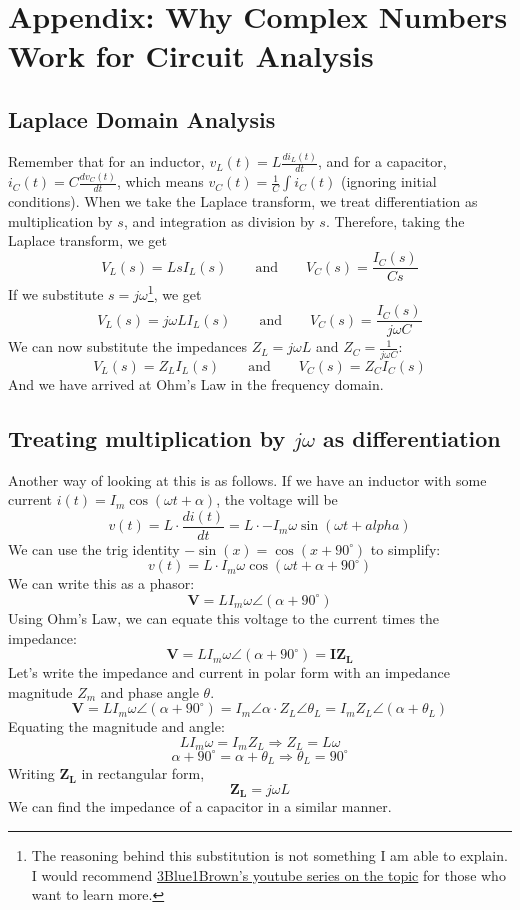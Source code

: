 \documentclass{article}
\begin{document}
\section{Appendix: Why Complex Numbers Work for Circuit Analysis}
\subsection*{Laplace Domain Analysis}
Remember that for an inductor, $v_L(t) = L\frac{di_L(t)}{dt}$, and for a capacitor, $i_C(t) = C\frac{dv_C(t)}{dt}$, which means $v_C(t) = \frac{1}{C}\int i_C(t)$ (ignoring initial conditions). When we take the Laplace transform, we treat differentiation as multiplication by $s$, and integration as division by $s$. Therefore, taking the Laplace transform, we get 
$$V_L(s) = LsI_L(s) \qquad \textrm{and} \qquad V_C(s) = \frac{I_C(s)}{Cs}$$ 
If we substitute $s = j\omega$\footnote{The reasoning behind this substitution is not something I am able to explain. I would recommend \href{https://www.youtube.com/watch?v=j0wJBEZdwLs}{3Blue1Brown's youtube series on the topic} for those who want to learn more.}, we get
$$V_L(s) = j\omega L I_L(s) \qquad \textrm{and} \qquad V_C(s) = \frac{I_C(s)}{j\omega C}$$
We can now substitute the impedances $Z_L = j\omega L$ and $Z_C = \frac{1}{j\omega C}$:
$$V_L(s) = Z_L I_L(s) \qquad \textrm{and} \qquad V_C(s) = Z_C I_C(s)$$
And we have arrived at Ohm's Law in the frequency domain.
\subsection*{Treating multiplication by $j\omega$ as differentiation}
Another way of looking at this is as follows. If we have an inductor with some current $i(t) = I_m\cos(\omega t + \alpha)$, the voltage will be
$$v(t) = L\cdot\frac{di(t)}{dt} = L\cdot-I_m\omega\sin(\omega t + alpha)$$
We can use the trig identity $-\sin(x) = \cos(x + 90^\circ)$ to simplify:
$$v(t) = L\cdot I_m\omega\cos(\omega t + \alpha + 90^\circ)$$
We can write this as a phasor:
$$\bm{V} = LI_m\omega \angle (\alpha + 90^\circ)$$
Using Ohm's Law, we can equate this voltage to the current times the impedance:
$$\bm{V} = LI_m\omega \angle (\alpha + 90^\circ) = \bm{I}\bm{Z_L}$$
Let's write the impedance and current in polar form with an impedance magnitude $Z_m$ and phase angle $\theta$.
$$\bm{V} = LI_m\omega \angle (\alpha + 90^\circ) = I_m \angle \alpha \cdot Z_L \angle \theta_L = I_mZ_L \angle (\alpha + \theta_L)$$
Equating the magnitude and angle:
$$LI_m\omega = I_mZ_L \Rightarrow Z_L = L\omega$$
$$\alpha + 90^\circ = \alpha + \theta_L \Rightarrow \theta_L = 90^\circ$$
Writing $\bm{Z_L}$ in rectangular form,
$$\bm{Z_L}= j\omega L$$
We can find the impedance of a capacitor in a similar manner.
\end{document}
